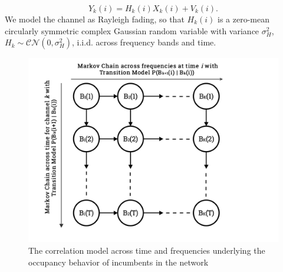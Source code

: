 \documentclass[10pt,twocolumn]{IEEEtran}
\begin{document}
\begin{equation}\label{3}
    Y_k(i) = H_{k}(i)X_{k}(i) + V_k(i).
\end{equation}
We model the channel as Rayleigh fading, so that $H_{k}(i)$ is a zero-mean circularly symmetric complex Gaussian random variable with variance $\sigma_H^2$, $H_k {\sim} \mathcal{CN}(0,\sigma_H^2)$, i.i.d. across frequency bands and time.
\begin{figure}
    \centering
    \includegraphics[width=1.0\linewidth]{MarkovChainsVisualization}
    \caption{The correlation model across time and frequencies underlying the occupancy behavior of incumbents in the network}
    \label{fig:1}
\end{figure}
\end{document}
